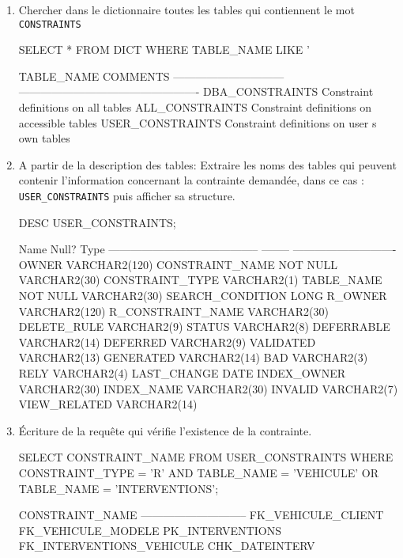 \documentclass[•]{article}
\begin{document}
\begin{enumerate}
	\item Chercher dans le dictionnaire toutes les tables qui contiennent le mot \texttt{CONSTRAINTS}
	\begin{sql}
SELECT * 
FROM DICT 
WHERE TABLE_NAME LIKE '%

TABLE_NAME		       COMMENTS
------------------------------ -------------------------------------------------
DBA_CONSTRAINTS 	       Constraint definitions on all tables
ALL_CONSTRAINTS 	       Constraint definitions on accessible tables
USER_CONSTRAINTS	       Constraint definitions on user s own tables
	\end{sql}
	
	\item A partir de la description des tables: Extraire les noms des tables qui peuvent contenir l'information concernant la contrainte demandée, dans ce cas : \texttt{USER\_CONSTRAINTS} puis afficher sa structure.
	
	\begin{sql}
DESC USER_CONSTRAINTS;

 Name                                      Null?    Type
 ----------------------------------------- -------- ----------------------------
 OWNER                                              VARCHAR2(120)
 CONSTRAINT_NAME                           NOT NULL VARCHAR2(30)
 CONSTRAINT_TYPE                                    VARCHAR2(1)
 TABLE_NAME                                NOT NULL VARCHAR2(30)
 SEARCH_CONDITION                                   LONG
 R_OWNER                                            VARCHAR2(120)
 R_CONSTRAINT_NAME                                  VARCHAR2(30)
 DELETE_RULE                                        VARCHAR2(9)
 STATUS                                             VARCHAR2(8)
 DEFERRABLE                                         VARCHAR2(14)
 DEFERRED                                           VARCHAR2(9)
 VALIDATED                                          VARCHAR2(13)
 GENERATED                                          VARCHAR2(14)
 BAD                                                VARCHAR2(3)
 RELY                                               VARCHAR2(4)
 LAST_CHANGE                                        DATE
 INDEX_OWNER                                        VARCHAR2(30)
 INDEX_NAME                                         VARCHAR2(30)
 INVALID                                            VARCHAR2(7)
 VIEW_RELATED                                       VARCHAR2(14)
	\end{sql}
	\item Écriture de la requête qui vérifie l'existence de la contrainte.
	\begin{sql}
 SELECT CONSTRAINT_NAME
 FROM USER_CONSTRAINTS
 WHERE CONSTRAINT_TYPE = 'R' AND TABLE_NAME = 'VEHICULE' OR TABLE_NAME = 'INTERVENTIONS';

CONSTRAINT_NAME
-----------------------------
FK_VEHICULE_CLIENT
FK_VEHICULE_MODELE
PK_INTERVENTIONS
FK_INTERVENTIONS_VEHICULE
CHK_DATEINTERV

	\end{sql}
\end{enumerate}
\end{document}
